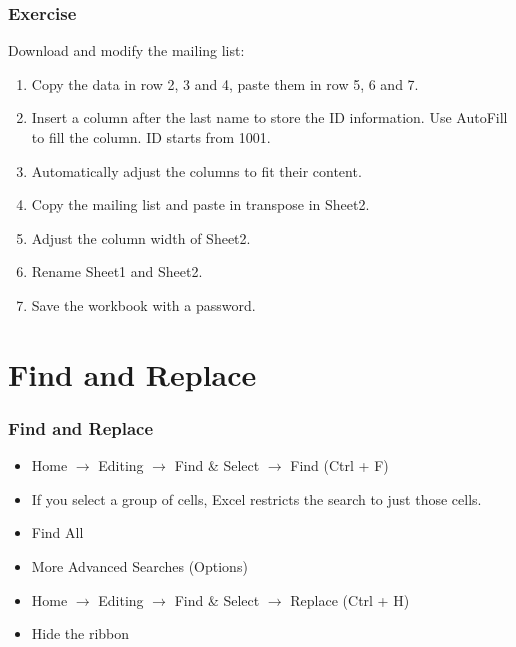 \documentclass[12pt]{beamer}
\begin{document}
	\begin{frame}
		\frametitle{Exercise}
		Download and modify the mailing list:
		\begin{enumerate}
			\item Copy the data in row 2, 3 and 4, paste them in row 5, 6
			and 7.
			\item Insert a column after the last name to store the ID information. Use AutoFill to fill the column. ID starts from 1001.
			\item Automatically adjust the columns to fit their content. \item Copy the mailing list and paste in transpose in Sheet2. 
			\item Adjust the column width of Sheet2.
			\item Rename Sheet1 and Sheet2.
			\item Save the workbook with a password.
		\end{enumerate}
	\end{frame}
\section{Find and Replace}
	\begin{frame}
		\frametitle{Find and Replace}
			\begin{itemize}
				\item Home $\rightarrow$ Editing $\rightarrow$ Find \& Select $\rightarrow$ Find (Ctrl + F)
				\item If you select a group of cells, Excel restricts the search to just those cells.
				\item Find All
				\item More Advanced Searches (Options)
				\item Home $\rightarrow$ Editing $\rightarrow$ Find \& Select $\rightarrow$ Replace (Ctrl + H)
				\item Hide the ribbon
			\end{itemize}
	\end{frame}
\end{document}
